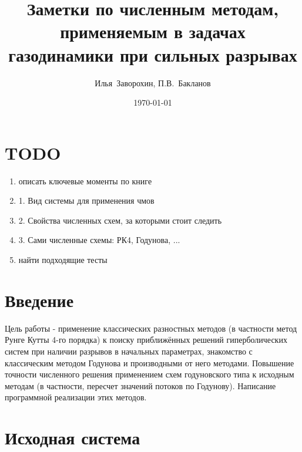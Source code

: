 \documentclass[a4paper,12pt]{extarticle}
\begin{document}
\title{\large
 Заметки по численным методам, применяемым в задачах газодинамики при сильных разрывах
}

\author{Илья~Заворохин, П.В.~Бакланов}

\date{\today}

\maketitle

\tableofcontents


\section*{TODO}

\begin{enumerate}
    \item описать ключевые моменты по книге \cite{MolchanovGasdynamics2013}
    \item 1. Вид системы для применения чмов
    \item 2. Свойства численных схем, за которыми стоит следить
    \item 3. Сами численные схемы: РК4, Годунова, ...
    \item найти подходящие тесты
\end{enumerate}

\newpage
\section{Введение}
    Цель работы - применение классических разностных методов (в частности метод Рунге Кутты 4-го порядка) к поиску приближённых решений гиперболических систем при наличии разрывов в начальных параметрах, знакомство с классическим методом Годунова и производными от него методами. Повышение точности численного решения применением схем годуновского типа к исходным методам (в частности, пересчет значений потоков по Годунову). Написание программной реализации этих методов.

\section{Исходная система}
\end{document}

